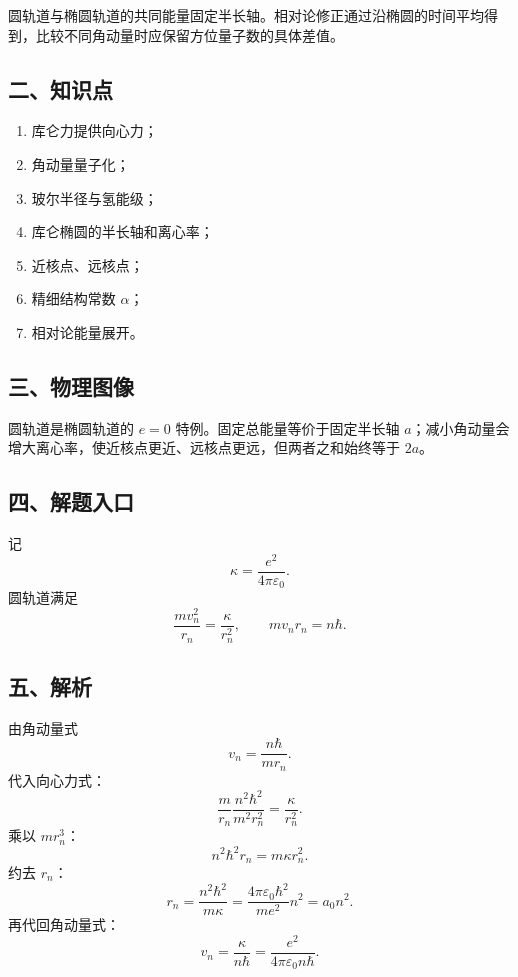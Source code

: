 \documentclass[12pt,a4paper,UTF8]{ctexart}
\newcommand{\tightlist}{\setlength{\itemsep}{0pt}\setlength{\parskip}{0pt}}
\begin{document}
圆轨道与椭圆轨道的共同能量固定半长轴。相对论修正通过沿椭圆的时间平均得到，比较不同角动量时应保留方位量子数的具体差值。

\subsection{二、知识点}\label{ux4e8cux77e5ux8bc6ux70b9-7}

\begin{enumerate}
\def\labelenumi{\arabic{enumi}.}
\tightlist
\item
  库仑力提供向心力；
\item
  角动量量子化；
\item
  玻尔半径与氢能级；
\item
  库仑椭圆的半长轴和离心率；
\item
  近核点、远核点；
\item
  精细结构常数 \(\alpha\)；
\item
  相对论能量展开。
\end{enumerate}

\subsection{三、物理图像}\label{ux4e09ux7269ux7406ux56feux50cf-7}

圆轨道是椭圆轨道的 \(e=0\) 特例。固定总能量等价于固定半长轴
\(a\)；减小角动量会增大离心率，使近核点更近、远核点更远，但两者之和始终等于
\(2a\)。

\subsection{四、解题入口}\label{ux56dbux89e3ux9898ux5165ux53e3-7}

记 \[
\kappa=\frac{e^2}{4\pi\varepsilon_0}.
\] 圆轨道满足 \[
\frac{mv_n^2}{r_n}=\frac{\kappa}{r_n^2},
\qquad
mv_nr_n=n\hbar. \tag{1}
\]

\subsection{五、解析}\label{ux4e94ux89e3ux6790-7}

由角动量式 \[
v_n=\frac{n\hbar}{mr_n}.
\] 代入向心力式： \[
\frac{m}{r_n}
\frac{n^2\hbar^2}{m^2r_n^2}
=\frac{\kappa}{r_n^2}.
\] 乘以 \(mr_n^3\)： \[
n^2\hbar^2r_n=m\kappa r_n^2.
\] 约去 \(r_n\)： \[
\boxed{
r_n=\frac{n^2\hbar^2}{m\kappa}
=\frac{4\pi\varepsilon_0\hbar^2}{me^2}n^2
=a_0n^2
}. \tag{2}
\] 再代回角动量式： \[
\boxed{
v_n=\frac{\kappa}{n\hbar}
=\frac{e^2}{4\pi\varepsilon_0n\hbar}
}. \tag{3}
\]
\end{document}
